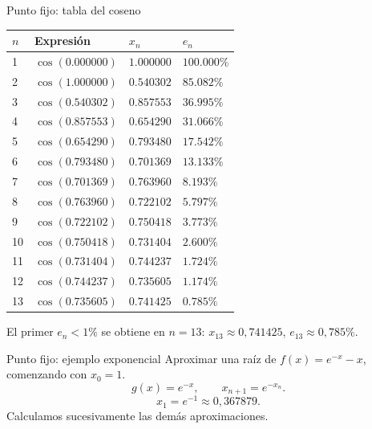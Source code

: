 \documentclass[main.tex]{subfiles}
\begin{document}
\begin{frame}{Punto fijo: tabla del coseno}
{\scriptsize\setlength{\tabcolsep}{5pt}\begin{center}\begin{tabular}{|C{.07\textwidth}|C{.35\textwidth}|C{.2\textwidth}|C{.2\textwidth}|}\hline $n$ & Expresión & $x_n$ & $e_n$\\\hline
\rule{0pt}{3.2mm}1 & $\cos(0.000000)$ & $1.000000$ & $100.000\%$\\\hline
\rule{0pt}{3.2mm}2 & $\cos(1.000000)$ & $0.540302$ & $85.082\%$\\\hline
\rule{0pt}{3.2mm}3 & $\cos(0.540302)$ & $0.857553$ & $36.995\%$\\\hline
\rule{0pt}{3.2mm}4 & $\cos(0.857553)$ & $0.654290$ & $31.066\%$\\\hline
\rule{0pt}{3.2mm}5 & $\cos(0.654290)$ & $0.793480$ & $17.542\%$\\\hline
\rule{0pt}{3.2mm}6 & $\cos(0.793480)$ & $0.701369$ & $13.133\%$\\\hline
\rule{0pt}{3.2mm}7 & $\cos(0.701369)$ & $0.763960$ & $8.193\%$\\\hline
\rule{0pt}{3.2mm}8 & $\cos(0.763960)$ & $0.722102$ & $5.797\%$\\\hline
\rule{0pt}{3.2mm}9 & $\cos(0.722102)$ & $0.750418$ & $3.773\%$\\\hline
\rule{0pt}{3.2mm}10 & $\cos(0.750418)$ & $0.731404$ & $2.600\%$\\\hline
\rule{0pt}{3.2mm}11 & $\cos(0.731404)$ & $0.744237$ & $1.724\%$\\\hline
\rule{0pt}{3.2mm}12 & $\cos(0.744237)$ & $0.735605$ & $1.174\%$\\\hline
\rule{0pt}{3.2mm}13 & $\cos(0.735605)$ & $0.741425$ & $0.785\%$\\\hline
\end{tabular}\end{center}}\footnotesize El primer $e_n<1\%$ se obtiene en $n=13$: $x_{13}\approx0{,}741425$, $e_{13}\approx0{,}785\%$.
\end{frame}

\begin{frame}{Punto fijo: ejemplo exponencial}
Aproximar una raíz de $f(x)=e^{-x}-x$, comenzando con $x_0=1$.\[g(x)=e^{-x},\qquad x_{n+1}=e^{-x_n}.\]\[x_1=e^{-1}\approx0{,}367879.\]Calculamos sucesivamente las demás aproximaciones.
\end{frame}
\end{document}
